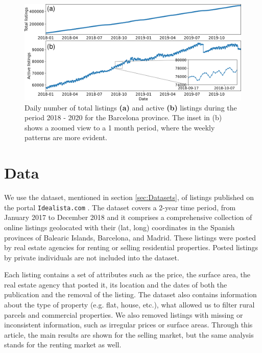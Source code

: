 \begin{figure}
    \vspace{0.2 cm}
    \centering
    \includegraphics[width =\textwidth]{Figs/Idealista_dynamics/adds_evo.pdf}
	\caption[Active listings evolution.]{\label{fig:active_adds} Daily number of total listings \textbf{(a)} and active \textbf{(b)} listings during the period 2018 - 2020 for the Barcelona province. The inset in (b) shows a zoomed view to a 1 month period, where the weekly patterns are more evident.}
\end{figure}


\section{Data \label{sec:Data}}

We use the dataset, mentioned in section \ref{sec:Datasets}, of listings published on the portal \texttt{Idealista.com} \cite{idealista}. The dataset covers a 2-year time period, from January 2017 to December 2018 and it comprises a comprehensive collection of online listings geolocated with their (lat, long) coordinates in the Spanish provinces of Balearic Islands, Barcelona, and Madrid. These listings were posted by real estate agencies for renting or selling residential properties. Posted listings by private individuals are not included into the dataset.

Each listing contains a set of attributes such as the price, the surface area, the real estate agency that posted it, its location and the dates of both the publication and the removal of the listing. The dataset also contains information about the type of property (e.g. flat, house, etc.), what allowed us to filter rural parcels and commercial properties. We also removed listings with missing or inconsistent information, such as irregular prices or surface areas. Through this article, the main results are shown for the selling market, but the same analysis stands for the renting market as well.

